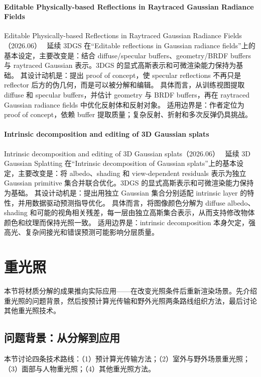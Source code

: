 \paragraph{Editable Physically-based Reflections in Raytraced Gaussian Radiance Fields}
Editable Physically-based Reflections in Raytraced Gaussian Radiance Fields（2026.06）~\cite{2606_30861} 延续 3DGS 在“Editable reflections in Gaussian radiance fields”上的基本设定，主要改变是：结合 diffuse/specular buffers、geometry/BRDF buffers 与 raytraced Gaussian 表示。3DGS 的显式高斯表示和可微渲染能力保持为基础。
其设计动机是：提出 proof of concept，使 specular reflections 不再只是 reflector 后方的伪几何，而是可以被分解和编辑。
具体而言，从训练视图提取 diffuse 和 specular buffers，并估计 geometry 与 BRDF buffers，再在 raytraced Gaussian radiance fields 中优化反射体和反射对象。
适用边界是：作者定位为 proof of concept，依赖 buffer 提取质量；复杂反射、折射和多次反弹仍具挑战。

\paragraph{Intrinsic decomposition and editing of 3D Gaussian splats}
Intrinsic decomposition and editing of 3D Gaussian splats（2026.06）~\cite{2606_31637} 延续 3D Gaussian Splatting 在“Intrinsic decomposition of Gaussian splats”上的基本设定，主要改变是：将 albedo、shading 和 view-dependent residuals 表示为独立 Gaussian primitive 集合并联合优化。3DGS 的显式高斯表示和可微渲染能力保持为基础。
其设计动机是：提出用独立 Gaussian 集合分别适配 intrinsic layer 的特性，并用数据驱动预测指导优化。
具体而言，将图像颜色分解为 diffuse albedo、shading 和可能的视角相关残差，每一层由独立高斯集合表示，从而支持修改物体颜色和纹理而保持光照一致。
适用边界是：intrinsic decomposition 本身欠定，强高光、复杂间接光和错误预测可能影响分层质量。
\section{重光照}
\label{sec:05_3}

本节将材质分解的成果推向实际应用——在改变光照条件后重新渲染场景。先介绍重光照的问题背景，然后按预计算光传输和野外光照两条路线组织方法，最后讨论其他重光照技术。

\subsection{问题背景：从分解到应用}

本节讨论四条技术路线：（1）预计算光传输方法；（2）室外与野外场景重光照；（3）面部与人物重光照；（4）其他重光照方法。

